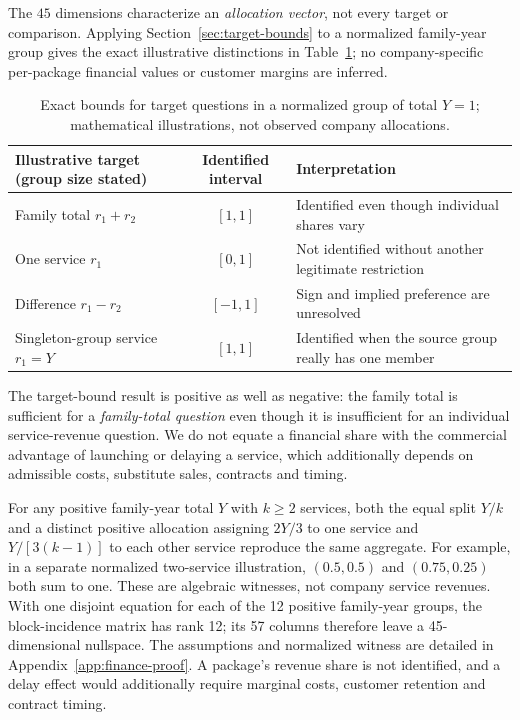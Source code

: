 \documentclass[systems,article,submit,moreauthors]{Definitions/mdpi}
\begin{document}
The $45$ dimensions characterize an \emph{allocation vector}, not every target or comparison. Applying Section~\ref{sec:target-bounds} to a normalized family-year group gives the exact illustrative distinctions in Table~\ref{tab:financial-targets}; no company-specific per-package financial values or customer margins are inferred.
\begin{table}[H]
\centering\footnotesize
\caption{Exact bounds for target questions in a normalized group of total $Y=1$; mathematical illustrations, not observed company allocations.}
\label{tab:financial-targets}
\begin{tabularx}{\linewidth}{>{\raggedright\arraybackslash}p{4.0cm} c X}
\toprule
Illustrative target (group size stated) & Identified interval & Interpretation\\
\midrule
Family total $r_1+r_2$ & $[1,1]$ & Identified even though individual shares vary\\
One service $r_1$ & $[0,1]$ & Not identified without another legitimate restriction\\
Difference $r_1-r_2$ & $[-1,1]$ & Sign and implied preference are unresolved\\
Singleton-group service $r_1=Y$ & $[1,1]$ & Identified when the source group really has one member\\
\bottomrule
\end{tabularx}
\end{table}
The target-bound result is positive as well as negative: the family total is sufficient for a \emph{family-total question} even though it is insufficient for an individual service-revenue question. We do not equate a financial share with the commercial advantage of launching or delaying a service, which additionally depends on admissible costs, substitute sales, contracts and timing.


For any positive family-year total $Y$ with $k\ge2$ services, both the equal split $Y/k$ and a distinct positive allocation assigning $2Y/3$ to one service and $Y/[3(k-1)]$ to each other service reproduce the same aggregate. For example, in a separate normalized two-service illustration, $(0.5,0.5)$ and $(0.75,0.25)$ both sum to one. These are algebraic witnesses, not company service revenues. With one disjoint equation for each of the 12 positive family-year groups, the block-incidence matrix has rank 12; its 57 columns therefore leave a 45-dimensional nullspace. The assumptions and normalized witness are detailed in Appendix~\ref{app:finance-proof}. A package's revenue share is not identified, and a delay effect would additionally require marginal costs, customer retention and contract timing.
\end{document}
